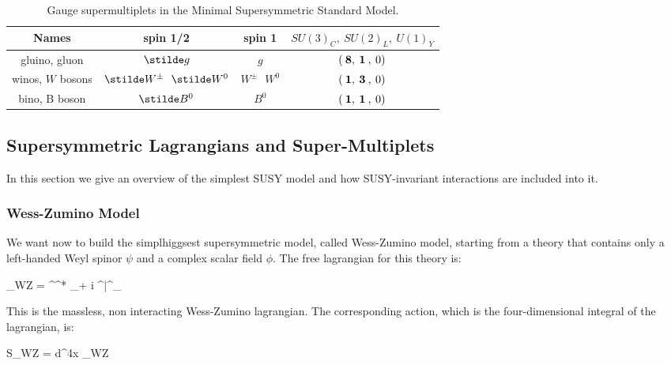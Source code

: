 \renewcommand{\arraystretch}{1.55}
\begin{table}[t]
\begin{center}
\begin{tabular}{c c c c}
\hline
Names & spin 1/2 & spin 1 & $SU(3)_C, \> SU(2)_L,\> U(1)_Y$\\
\hline\hline
gluino, gluon &$ \stilde g$& $g$ & $(\>{\bf 8},\>{\bf 1}\>,\> 0)$
\\
\hline
winos, $W$ bosons & $ \stilde W^\pm\>\>\> \stilde W^0 $&
 $W^\pm\>\>\> W^0$ & $(\>{\bf 1},\>{\bf 3}\>,\> 0)$
\\
\hline
bino, B boson &$\stilde B^0$&
 $B^0$ & $(\>{\bf 1},\>{\bf 1}\>,\> 0)$
\\
\hline
\end{tabular}
\caption{Gauge supermultiplets in
the Minimal Supersymmetric Standard Model.\label{tab:gauge}}
\vspace{-0.45cm}
\end{center}
\end{table}


\subsection{Supersymmetric Lagrangians and Super-Multiplets}

In this section we give an overview of the simplest SUSY model and how SUSY-invariant interactions are included into it.

\subsubsection*{Wess-Zumino Model}

We want now to build the simplhiggsest supersymmetric model, called Wess-Zumino model, starting from a theory that contains only a left-handed Weyl spinor $\psi$ and a complex scalar field $\phi$. The free lagrangian for this theory is:

\beq
{}_{WZ} = \partial^\mu \phi^* \partial_\mu \phi + i \psi^\dagger \bar{\sigma}^\mu \partial_\mu \psi
\label{eq:WZL}
\eeq

This is the massless, non interacting Wess-Zumino lagrangian. The corresponding action, which is the four-dimensional integral of the lagrangian, is:

\beq
S_{WZ} = \int d^4x \; _{WZ}
\eeq


